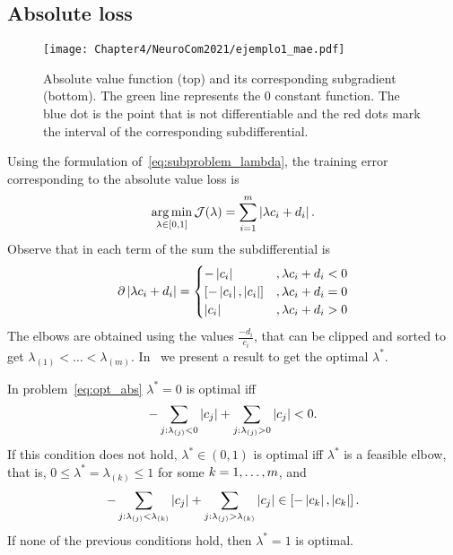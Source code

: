 \subsection{Absolute loss}
\begin{figure}[t!]
    \centering
    \texttt{[image: Chapter4/NeuroCom2021/ejemplo1\_mae.pdf]}
    \caption{Absolute value function (top) and its corresponding subgradient (bottom). The green line represents the $0$ constant function. The blue dot is the point that is not differentiable and the red dots mark the interval of the corresponding subdifferential.}
    \label{fig:abs_loss}
\end{figure}
Using the formulation of~\eqref{eq:subproblem_lambda}, the training error corresponding to the absolute value loss is
\begin{equation}
    \label{eq:opt_abs}
    \argmin_{\lambda \in [0, 1]} \mathcal{J}(\lambda) = \sum_{i=1}^{\npertask} \abs{\lambda c_i + d_i}.
\end{equation}
Observe that in each term of the sum the subdifferential is 
\begin{align*}
    \partial \abs{\lambda c_i + d_i} = 
    \begin{cases}
        -\abs{c_i} &, \lambda c_i + d_i  < 0 \\
        [-\abs{c_i}, \abs{c_i}] &, \lambda c_i + d_i  = 0 \\
        \abs{c_i} &, \lambda c_i + d_i  > 0 \\
    \end{cases} 
\end{align*}
The elbows are obtained using the values $\frac{-d_i}{c_i}$, that can be clipped and sorted to get ${\lambda}_{(1)} < \ldots < {\lambda}_{(m)}$.
In~\citet[Proposition 2]{RuizAD21} we present a result to get the optimal $\lambda^*$.
\begin{prop}\label{prop:abs_neurocom2020}
    In problem~\eqref{eq:opt_abs} $\lambda^*=0$ is optimal iff
    \begin{equation}\nonumber
        - \sum_{j: \lambda_{(j)} < 0} \left|c_{j}\right| + \sum_{j: \lambda_{(j)} > 0} \left|c_{j}\right| < 0.
        \end{equation}
    If this condition does not hold, $\lambda^* \in (0,1)$ is optimal iff $\lambda^*$ is a feasible elbow, that is, $0 \leq \lambda^* = \lambda_{(k)} \leq 1$ for some $k=1, \dotsc, m$, and
    \begin{equation}\label{sol_abs_e}
    - \sum_{j: \lambda_{(j)} < \lambda_{(k)}} \abs{c_{j}} + \sum_{j: \lambda_{(j)} > \lambda_{(k)}} \abs{c_{j}} \in \left[ -  \abs{c_{k}},  \abs{c_{k}}  \right] .
    \end{equation}
    If none of the previous conditions hold, then $\lambda^*=1$ is optimal.
\end{prop}
